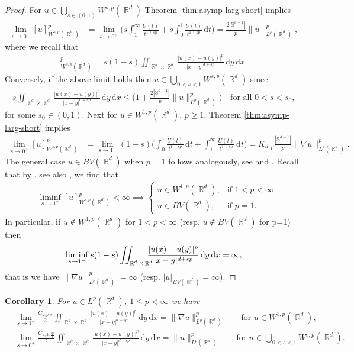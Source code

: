\documentclass[12pt, reqno]{amsart}%
\theoremstyle{plain}  %
\newtheorem{corollary}[theorem]{Corollary}
\theoremstyle{definition}  %
\theoremstyle{remark}
\numberwithin{equation}{section}
\DeclareMathOperator{\R}{\mathbb{R}}
\renewcommand{\d}{\,\mathrm{d}}
\begin{document}
\begin{proof}
For $u\in \bigcup_{s\in (0,1)} W^{s, p}(\R^d)$ Theorem \ref{thm:asymp-larg-short} implies
\begin{align*}
\lim_{s\to0^+}
[u]^p_{W^{s,p}(\R^d)}&= \lim_{s\to0^+}\Big( s\int_1^\infty \frac{U(t)}{t^{1+s p}}
+s\int_0^1 \frac{U(t) }{t^{1+s p}}\d t\Big) =\frac{2|\mathbb{S}^{d-1}|}{p}\|u\|^p_{L^p(\R^d)},
\end{align*}
where we recall  that
\begin{align*}
[u]^p_{W^{s,p}(\R^d)}= s(1-s)\iint_{\R^d \times \R^d} \frac{ |u(x) - u(y)|^p}{|x-y|^{d+s p}}\d y\d x.
\end{align*}
Conversely, if the above limit holds then  $u\in \bigcup_{0 < s < 1} W^{s,p}(\R^d)$ since
\begin{align*}
s\iint_{\R^d \times \R^d} \frac{ |u(x) - u(y)|^p}{|x-y|^{d+s p}}\d y\d x\leq \big(1+\tfrac{2|\mathbb{S}^{d-1}|}{p}\|u\|^p_{L^p(\R^d)}\big)\quad\text{for all $0<s<s_0$},
\end{align*}
for some $s_0\in (0,1)$. Next for $u\in W^{1,p}(\R^d)$, $p\geq1$, Theorem \ref{thm:asymp-larg-short} implies
\begin{align*}
\lim_{s\to0^+}
[u]^p_{W^{s,p}(\R^d)}
&= \lim_{s\to1^-} (1-s) \Big( \int_0^1 \frac{U(t) }{t^{1+s p}}\d t+ \int_1^\infty  \frac{U(t) }{t^{1+s p}}\d t\Big)
= K_{d,p}\frac{|\mathbb{S}^{d-1}|}{p}\|\nabla u\|^p_{L^p(\R^d)}.
\end{align*}
The general case $u\in BV(\R^d)$ when $p=1$ follows
analogously, see \cite{Fog23} and \cite{Dav02}. Recall that by \cite{BBM01}, see also \cite[Theorem 1.1]{Fog23}, we find that
\begin{align*}
&\liminf_{s\to1^-}
[u]^p_{W^{s,p}(\R^d)}<\infty \implies \begin{cases}
u\in W^{1,p}(\R^d), & \text{if } 1<p<\infty\\
u\in BV(\R^d),&\text{if } p=1.
\end{cases}
\end{align*}
In particular, if $u\notin W^{1,p}(\R^d)$ for $1<p<\infty$ (resp. $u\notin BV(\R^d)$ for p=1) then
\begin{align*}
\liminf_{s\to1^-}s(1-s)\iint_{\R^d \times \R^d}\hspace{-2ex} \frac{ |u(x) - u(y)|^p}{|x-y|^{d+s p}}\d y \d x=\infty,
\end{align*}
that is we have $\|\nabla u\|^p_{L^{p}(\R^d)}=\infty$ (resp. $|u|_{BV(\R^d)}=\infty$).
\end{proof}

 \begin{corollary}
For $u\in L^p(\R^d)$, $1\leq p<\infty$ we have
\begin{align*}
&\lim_{s\to1^-} \frac{C_{d,p,s}}{2} \iint_{\R^d \times \R^d} \frac{ |u(x) - u(y)|^p}{|x-y|^{d+s p}}\d y\d x=  \|\nabla u\|^p_{L^p(\R^d)}\qquad \text{for $u\in  W^{1,p}(\R^d)$},\\
&\lim_{s\to0^+} \frac{C_{d,2,\frac{sp}{2}}}{2} \iint_{\R^d \times \R^d} \frac{ |u(x) - u(y)|^p}{|x-y|^{d+s p}}\d y\d x=  \|u\|^p_{L^p(\R^d)} \qquad \text{for  $u\in \bigcup_{0 < s < 1} W^{s,p}(\R^d)$}. 
\end{align*}
\end{corollary}
\end{document}

